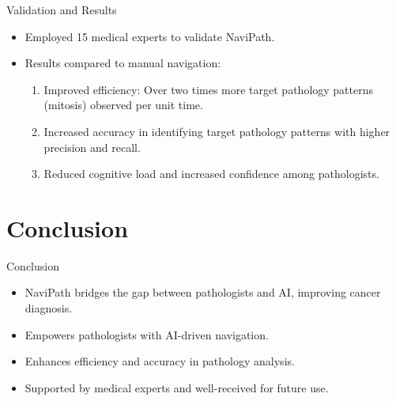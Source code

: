 \documentclass{beamer}
\begin{document}
\begin{frame}{Validation and Results}
    \begin{itemize}
        \item Employed 15 medical experts to validate NaviPath.
        \item Results compared to manual navigation:
        \begin{enumerate}
            \item Improved efficiency: Over two times more target pathology patterns (mitosis) observed per unit time.
            \item Increased accuracy in identifying target pathology patterns with higher precision and recall.
            \item Reduced cognitive load and increased confidence among pathologists.
        \end{enumerate}
    \end{itemize}
\end{frame}

\section{Conclusion}

\begin{frame}{Conclusion}
    \begin{itemize}
        \item NaviPath bridges the gap between pathologists and AI, improving cancer diagnosis.
        \item Empowers pathologists with AI-driven navigation.
        \item Enhances efficiency and accuracy in pathology analysis.
        \item Supported by medical experts and well-received for future use.
    \end{itemize}
\end{frame}
\end{document}
